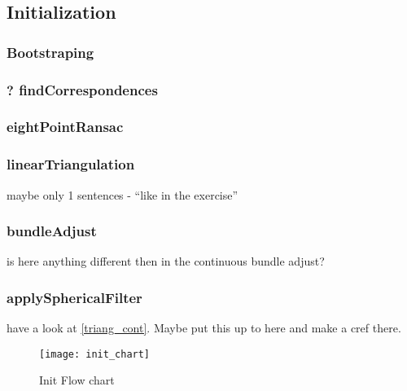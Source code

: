 \subsection{Initialization}
\label{sec_init}

\subsubsection{Bootstraping}

\subsubsection{? findCorrespondences}

\subsubsection{eightPointRansac}

\subsubsection{linearTriangulation}
maybe only 1 sentences - ``like in the exercise''

\subsubsection{bundleAdjust}
is here anything different then in the continuous bundle adjust?

\subsubsection{applySphericalFilter}
have a look at \cref{triang_cont}. Maybe put this up to here and make a cref there.

\begin{figure}[ht]
	\centering
	\texttt{[image: init\_chart]}
	\caption{Init Flow chart}
	\label{img_flow_init}
\end{figure}